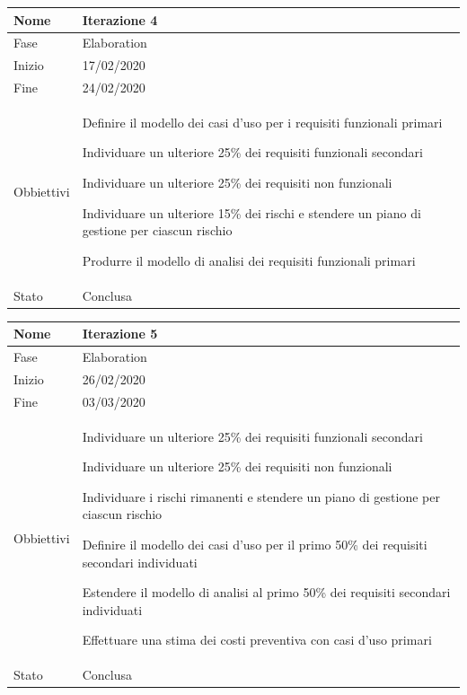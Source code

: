 \begin{center}
\begin{tabular}{ |p{2cm}|p{10cm}|  }
\hline
Nome & Iterazione 4 \\\hline
Fase & Elaboration \\\hline
Inizio & 17/02/2020 \\\hline
Fine &  24/02/2020 \\\hline
Obbiettivi & 
	\begin{compactitem}
		\item Definire il modello dei casi d'uso per i requisiti funzionali primari
		\item Individuare un ulteriore 25\% dei requisiti funzionali secondari
		\item Individuare un ulteriore 25\% dei requisiti non funzionali
		\item Individuare un ulteriore 15\% dei rischi e stendere un piano di gestione per ciascun rischio
		\item Produrre il modello di analisi dei requisiti funzionali primari
	\end{compactitem}\\\hline
Stato &  Conclusa \\\hline
\end{tabular}
\label{table:4}\newline

\begin{tabular}{ |p{2cm}|p{10cm}|  }
\hline
Nome & Iterazione 5 \\\hline
Fase & Elaboration \\\hline
Inizio & 26/02/2020 \\\hline
Fine &  03/03/2020  \\\hline
Obbiettivi & 
	\begin{compactitem}
		\item Individuare un ulteriore 25\% dei requisiti funzionali secondari %
		\item Individuare un ulteriore 25\% dei requisiti non funzionali %
		\item Individuare i rischi rimanenti e stendere un piano di gestione per ciascun rischio %
		\item Definire il modello dei casi d'uso per il primo 50\% dei requisiti secondari individuati
		\item Estendere il modello di analisi al primo 50\% dei requisiti secondari individuati
		\item Effettuare una stima dei costi preventiva con casi d'uso primari
	\end{compactitem}\\\hline
Stato &  Conclusa \\\hline
\end{tabular}
\label{table:5}\newline


\end{center}
